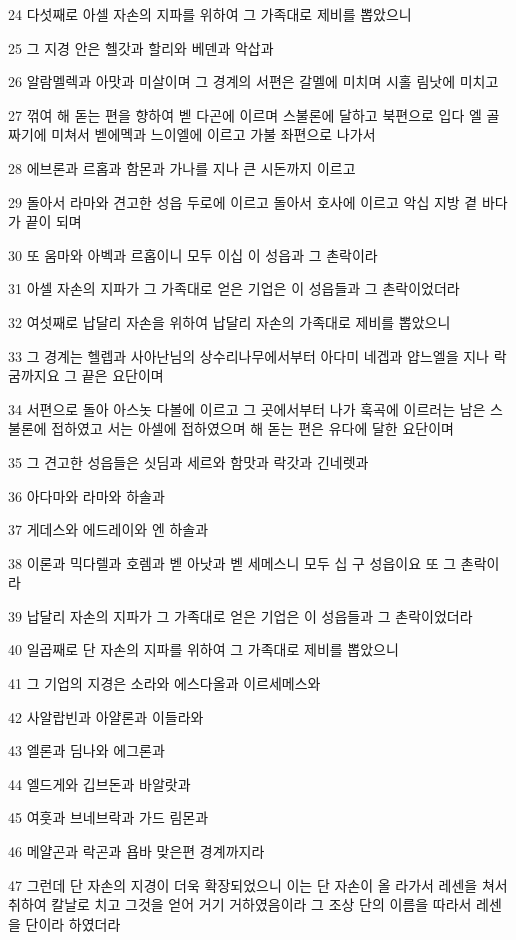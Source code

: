 \par 24 다섯째로 아셀 자손의 지파를 위하여 그 가족대로 제비를 뽑았으니
\par 25 그 지경 안은 헬갓과 할리와 베덴과 악삽과
\par 26 알람멜렉과 아맛과 미살이며 그 경계의 서편은 갈멜에 미치며 시홀 림낫에 미치고
\par 27 꺾여 해 돋는 편을 향하여 벧 다곤에 이르며 스불론에 달하고 북편으로 입다 엘 골짜기에 미쳐서 벧에멕과 느이엘에 이르고 가불 좌편으로 나가서
\par 28 에브론과 르홉과 함몬과 가나를 지나 큰 시돈까지 이르고
\par 29 돌아서 라마와 견고한 성읍 두로에 이르고 돌아서 호사에 이르고 악십 지방 곁 바다가 끝이 되며
\par 30 또 움마와 아벡과 르홉이니 모두 이십 이 성읍과 그 촌락이라
\par 31 아셀 자손의 지파가 그 가족대로 얻은 기업은 이 성읍들과 그 촌락이었더라
\par 32 여섯째로 납달리 자손을 위하여 납달리 자손의 가족대로 제비를 뽑았으니
\par 33 그 경계는 헬렙과 사아난님의 상수리나무에서부터 아다미 네겝과 얍느엘을 지나 락굼까지요 그 끝은 요단이며
\par 34 서편으로 돌아 아스놋 다볼에 이르고 그 곳에서부터 나가 훅곡에 이르러는 남은 스불론에 접하였고 서는 아셀에 접하였으며 해 돋는 편은 유다에 달한 요단이며
\par 35 그 견고한 성읍들은 싯딤과 세르와 함맛과 락갓과 긴네렛과
\par 36 아다마와 라마와 하솔과
\par 37 게데스와 에드레이와 엔 하솔과
\par 38 이론과 믹다렐과 호렘과 벧 아낫과 벧 세메스니 모두 십 구 성읍이요 또 그 촌락이라
\par 39 납달리 자손의 지파가 그 가족대로 얻은 기업은 이 성읍들과 그 촌락이었더라
\par 40 일곱째로 단 자손의 지파를 위하여 그 가족대로 제비를 뽑았으니
\par 41 그 기업의 지경은 소라와 에스다올과 이르세메스와
\par 42 사알랍빈과 아얄론과 이들라와
\par 43 엘론과 딤나와 에그론과
\par 44 엘드게와 깁브돈과 바알랏과
\par 45 여훗과 브네브락과 가드 림몬과
\par 46 메얄곤과 락곤과 욥바 맞은편 경계까지라
\par 47 그런데 단 자손의 지경이 더욱 확장되었으니 이는 단 자손이 올 라가서 레센을 쳐서 취하여 칼날로 치고 그것을 얻어 거기 거하였음이라 그 조상 단의 이름을 따라서 레센을 단이라 하였더라
